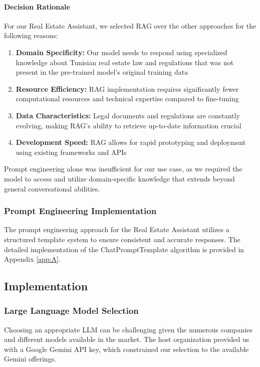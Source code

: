 \paragraph{Decision Rationale}
For our Real Estate Assistant, we selected RAG over the other approaches for the following reasons:

\begin{enumerate}
    \item \textbf{Domain Specificity:} Our model needs to respond using specialized knowledge about Tunisian real estate law and regulations that was not present in the pre-trained model's original training data
    \item \textbf{Resource Efficiency:} RAG implementation requires significantly fewer computational resources and technical expertise compared to fine-tuning
    \item \textbf{Data Characteristics:} Legal documents and regulations are constantly evolving, making RAG's ability to retrieve up-to-date information crucial
    \item \textbf{Development Speed:} RAG allows for rapid prototyping and deployment using existing frameworks and APIs
\end{enumerate}

Prompt engineering alone was insufficient for our use case, as we required the model to access and utilize domain-specific knowledge that extends beyond general conversational abilities.

\subsubsection{Prompt Engineering Implementation}
The prompt engineering approach for the Real Estate Assistant utilizes a structured template system to ensure consistent and accurate responses. The detailed implementation of the ChatPromptTemplate algorithm is provided in Appendix \ref{app:A}.

\subsection{Implementation}

\subsubsection{Large Language Model Selection}
Choosing an appropriate LLM can be challenging given the numerous companies and different models available in the market. The host organization provided us with a Google Gemini API key, which constrained our selection to the available Gemini offerings.

